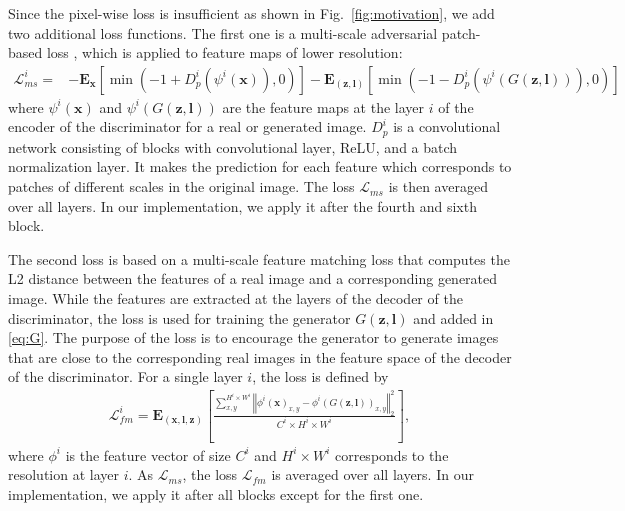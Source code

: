 \documentclass{bmvc2k}
\newcommand{\figref}[1]{Fig.~\ref{#1}}
\begin{document}
Since the pixel-wise loss is insufficient as shown in \figref{fig:motivation}, we add two additional loss functions. The first one is a multi-scale adversarial patch-based loss \cite{miyato2018spectral}, which is applied to feature maps of lower resolution:   
\begin{equation}
\begin{split}
    \mathcal{L}^i_{ms} = &-\mathbf{E}_{\mathbf{x}}\left[\min(-1 + D^i_{p}(\psi^i(\mathbf{x})), 0)\right]  - \mathbf{E}_{(\mathbf{z}, \mathbf{l})}\left[\min(-1-D^i_{p}(\psi^i(G(\mathbf{z},\mathbf{l}))), 0)\right] 
\end{split}
\label{eq:ms}
\end{equation}
where $\psi^i(\mathbf{x})$ and $\psi^i(G(\mathbf{z},\mathbf{l}))$ are the feature maps at the layer $i$ of the encoder of the discriminator for a real or generated image. $D^i_{p}$ is a convolutional network consisting of blocks with convolutional layer, ReLU, and a batch
normalization layer. It makes the prediction for each feature which corresponds to patches of different scales in the original image. The loss $\mathcal{L}_{ms}$ is then averaged over all layers. In our implementation, we apply it after the  fourth and sixth block. 

The second loss is based on a multi-scale feature matching loss \cite{johnson2016perceptual} that computes the L2 distance between the features of a real image and a corresponding generated image. While the features are extracted at the layers of the decoder of the discriminator, the loss is used for training the generator $G(\mathbf{z},\mathbf{l})$ and added in \eqref{eq:G}. The purpose of the loss is to encourage the generator to generate images that are close to the corresponding real images in the feature space of the decoder of the discriminator. For a single layer $i$, the loss is defined by        
\begin{equation}
\begin{split}
    \mathcal{L}^i_{fm} = \mathbf{E}_{(\mathbf{x}, \mathbf{l}, \mathbf{z})} \left[ \frac{\sum_{x,y}^{H^i \times W^i}\left\Vert \phi^i(\mathbf{x})_{x,y} - \phi^i(G(\mathbf{z},\mathbf{l}))_{x,y} \right\Vert^2_2}{C^i \times H^i \times W^i}\right], 
\end{split}
\label{eq:fm}
\end{equation}
where $\phi^i$ is the feature vector of size $C^i$ and $H^i \times W^i$ corresponds to the resolution at layer $i$. As $\mathcal{L}_{ms}$, the loss $\mathcal{L}_{fm}$ is averaged over all layers. In our implementation, we apply it after all blocks except for the first one. 
\end{document}
